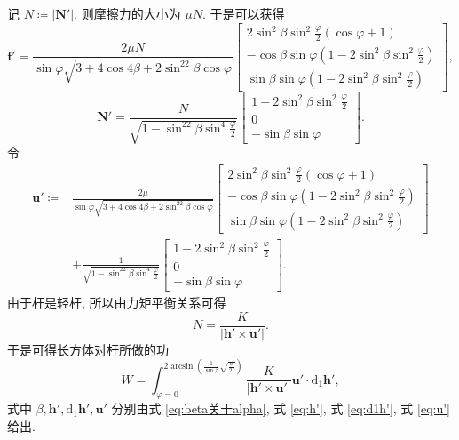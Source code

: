 \documentclass{article}
\begin{document}
记 $N\coloneqq \left|\mathbf N'\right|$.
则摩擦力的大小为 $\mu N$.
于是可以获得
\begin{equation}
	\mathbf f'=\frac{2\mu N}{\sin\varphi\sqrt{3+4\cos4\beta+2\sin^22\beta\cos\varphi}}
	\left[\begin{matrix}
		2\sin^2\beta\sin^2\frac\varphi2\left(\cos\varphi+1\right)\\
		-\cos\beta\sin\varphi\left(1-2\sin^2\beta\sin^2\frac\varphi2\right)\\
		\sin\beta\sin\varphi\left(1-2\sin^2\beta\sin^2\frac\varphi2\right)
	\end{matrix}\right],
\end{equation}
\begin{equation}
	\mathbf N'=\frac N{\sqrt{1-\sin^22\beta\sin^4\frac\varphi2}}\left[\begin{matrix}
	1-2\sin^2\beta\sin^2\frac\varphi2\\0\\-\sin\beta\sin\varphi\end{matrix}\right].
\end{equation}
令
\begin{equation}\begin{split}
	\label{eq:u'}
	\mathbf u'\coloneqq &\frac{2\mu}{\sin\varphi\sqrt{3+4\cos4\beta+2\sin^22\beta\cos\varphi}}
	\left[\begin{matrix}
		2\sin^2\beta\sin^2\frac\varphi2\left(\cos\varphi+1\right)\\
		-\cos\beta\sin\varphi\left(1-2\sin^2\beta\sin^2\frac\varphi2\right)\\
		\sin\beta\sin\varphi\left(1-2\sin^2\beta\sin^2\frac\varphi2\right)
	\end{matrix}\right]
	\\&+
	\frac 1{\sqrt{1-\sin^22\beta\sin^4\frac\varphi2}}\left[\begin{matrix}
	1-2\sin^2\beta\sin^2\frac\varphi2\\0\\-\sin\beta\sin\varphi\end{matrix}\right].
\end{split}\end{equation}
由于杆是轻杆, 所以由力矩平衡关系可得
\begin{equation}
	N=\frac K{\left|\mathbf h'\times\mathbf u'\right|}.
\end{equation}
于是可得长方体对杆所做的功
\begin{equation}
	W=\int_{\varphi=0}^{2\arcsin\left(\frac1{\sin\beta}\sqrt{\frac w{2l}}\right)}
	\frac K{\left|\mathbf h'\times\mathbf u'\right|}\mathbf u'\cdot\mathrm d_1\mathbf h',
\end{equation}
式中 $\beta,\mathbf h',\mathrm d_1\mathbf h',\mathbf u'$ 分别由式 \ref{eq:beta关于alpha},
式 \ref{eq:h'}, 式 \ref{eq:d1h'}, 式 \ref{eq:u'} 给出.
\end{document}
